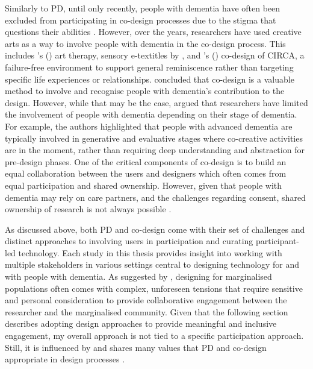 Similarly to PD, until only recently, people with dementia have often been excluded from participating in co-design processes due to the stigma that questions their abilities \citep{bell2019collaborative}. However, over the years, researchers have used creative arts as a way to involve people with dementia in the co-design process. This includes \citeauthor{lazar2018making}'s (\citeyear{lazar2018making}) art therapy, sensory e-textitles by \cite{treadaway_sensor_2016}, and \citeauthor{astell_stimulating_2010}'s (\citeyear{astell_stimulating_2010})  co-design of CIRCA, a failure-free environment to support general reminiscence rather than targeting specific life experiences or relationships. \cite{treadaway_sensor_2016} concluded that co-design is a valuable method to involve and recognise people with dementia's contribution to the design. However, while that may be the case, \cite{tsekleves2020engaging} argued that researchers have limited the involvement of people with dementia depending on their stage of dementia. For example, the authors highlighted that people with advanced dementia are typically involved in generative and evaluative stages where co-creative activities are in the moment, rather than requiring deep understanding and abstraction for pre-design phases. One of the critical components of co-design is to build an equal collaboration between the users and designers which often comes from equal participation and shared ownership. However, given that people with dementia may rely on care partners, and the challenges regarding consent, shared ownership of research is not always possible \citep{dewing_participatory_2007}. 

As discussed above, both PD and co-design come with their set of challenges and distinct approaches to involving users in participation and curating participant-led technology. Each study in this thesis provides insight into working with multiple stakeholders in various settings central to designing technology for and with people with dementia. As suggested by \cite{harrington_deconstructing_2019}, designing for marginalised populations often comes with complex, unforeseen tensions that require sensitive and personal consideration to provide collaborative engagement between the researcher and the marginalised community. Given that the following section describes adopting design approaches to provide meaningful and inclusive engagement, my overall approach is not tied to a specific participation approach. Still, it is influenced by and shares many values that PD and co-design appropriate in design processes \citep{hansen2019participatory}.


